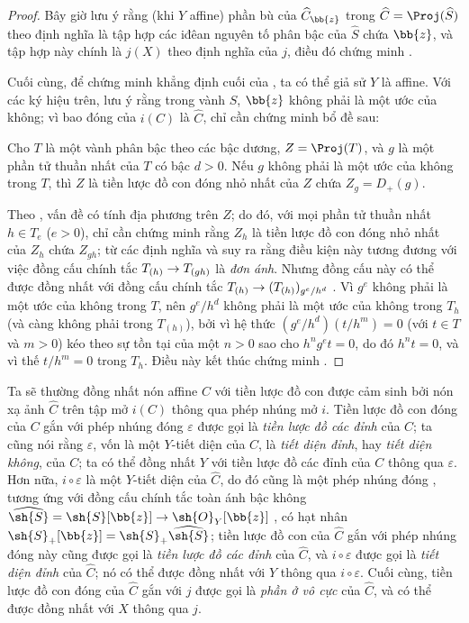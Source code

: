\documentclass[oneside,10pt]{amsart}
\makeatletter
\newcommand{\ega@arrow}[2]{\mathchoice{#1}{#2}{#2}{#2}}
\renewcommand{\to}{\ega@arrow{\longrightarrow}{\rightarrow}}
\newcommand{\oldpage}[2][]{\marginnote{\normalfont\footnotesize\textbf{#1}~|~#2}\ignorespaces}
\let\EGAOriginalLabel\label
\renewcommand{\label}[1]{\phantomsection\EGAOriginalLabel{#1}}
\makeatother
\begin{document}
\begin{proof}
Bây giờ lưu ý rằng (khi $Y$ affine) phần bù của $\widehat{C}_{\bb{z}}$ trong $\widehat{C}=\Proj(\widehat{S})$
\oldpage[II]{164}
theo định nghĩa là tập hợp các iđêan nguyên tố phân bậc của $\widehat{S}$ chứa $\bb{z}$, và tập hợp này chính là $j(X)$ theo định nghĩa của $j$, điều đó chứng minh .

Cuối cùng, để chứng minh khẳng định cuối của , ta có thể giả sử $Y$ là affine.
Với các ký hiệu trên, lưu ý rằng trong vành $\widehat{S}$, $\bb{z}$ không phải là một ước của không;
vì bao đóng của $i(C)$ là $\widehat{C}$, chỉ cần chứng minh bổ đề sau:
\begin{lemma}[8.3.2.7]
\label{II.8.3.2.7}
Cho $T$ là một vành phân bậc theo các bậc dương, $Z=\Proj(T)$, và $g$ là một phần tử thuần nhất của $T$ có bậc $d>0$.
Nếu $g$ không phải là một ước của không trong $T$, thì $Z$ là tiền lược đồ con đóng nhỏ nhất của $Z$ chứa $Z_g=D_+(g)$.
\end{lemma}

Theo , vấn đề có tính địa phương trên $Z$;
do đó, với mọi phần tử thuần nhất $h\in T_e$ ($e>0$), chỉ cần chứng minh rằng $Z_h$ là tiền lược đồ con đóng nhỏ nhất của $Z_h$ chứa $Z_{gh}$;
từ các định nghĩa và  suy ra rằng điều kiện này tương đương với việc đồng cấu chính tắc $T_{(h)}\to T_{(gh)}$ là \emph{đơn ánh}.
Nhưng đồng cấu này có thể được đồng nhất với đồng cấu chính tắc $T_{(h)}\to(T_{(h)})_{g^e/h^d}$ .
Vì $g^e$ không phải là một ước của không trong $T$, nên $g^e/h^d$ không phải là một ước của không trong $T_h$ (và càng không phải trong $T_{(h)}$), bởi vì hệ thức $(g^e/h^d)(t/h^m)=0$ (với $t\in T$ và $m>0$) kéo theo sự tồn tại của một $n>0$ sao cho $h^ng^et=0$, do đó $h^nt=0$, và vì thế $t/h^m=0$ trong $T_h$.
Điều này kết thúc chứng minh .
\end{proof}
\begin{env}[8.3.3]
\label{II.8.3.3}
Ta sẽ thường đồng nhất nón affine $C$ với tiền lược đồ con được cảm sinh bởi nón xạ ảnh $\widehat{C}$ trên tập mở $i(C)$ thông qua phép nhúng mở $i$.
Tiền lược đồ con đóng của $C$ gắn với phép nhúng đóng $\varepsilon$ được gọi là \emph{tiền lược đồ các đỉnh} của $C$;
ta cũng nói rằng $\varepsilon$, vốn là một $Y$-tiết diện của $C$, là \emph{tiết diện đỉnh}, hay \emph{tiết diện không}, của $C$;
ta có thể đồng nhất $Y$ với tiền lược đồ các đỉnh của $C$ thông qua $\varepsilon$.
Hơn nữa, $i\circ\varepsilon$ là một $Y$-tiết diện của $\widehat{C}$, do đó cũng là một phép nhúng đóng , tương ứng với đồng cấu chính tắc toàn ánh bậc không $\widehat{\sh{S}} = \sh{S}[\bb{z}] \to \sh{O}_Y[\bb{z}]$ , có hạt nhân $\sh{S}_+[\bb{z}] = \sh{S}_+\widehat{\sh{S}}$;
tiền lược đồ con của $\widehat{C}$ gắn với phép nhúng đóng này cũng được gọi là \emph{tiền lược đồ các đỉnh} của $\widehat{C}$, và $i\circ\varepsilon$ được gọi là \emph{tiết diện đỉnh} của $\widehat{C}$;
nó có thể được đồng nhất với $Y$ thông qua $i\circ\varepsilon$.
Cuối cùng, tiền lược đồ con đóng của $\widehat{C}$ gắn với $j$ được gọi là \emph{phần ở vô cực} của $\widehat{C}$, và có thể được đồng nhất với $X$ thông qua $j$.
\end{env}
\end{document}

